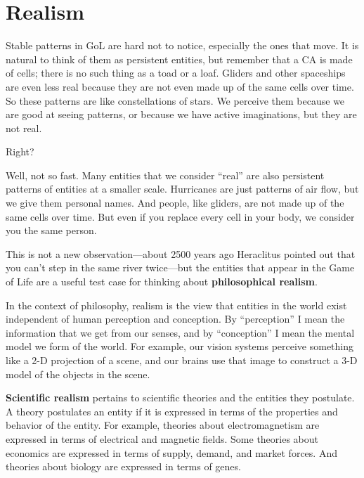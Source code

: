 \documentclass[12pt]{book}
\theoremstyle{exercise}
\begin{document}


\section{Realism}

Stable patterns in GoL are hard not to notice, especially the ones
that move.  It is natural to think of them as persistent entities, but
remember that a CA is made of cells; there is no such thing as a toad
or a loaf.  Gliders and other spaceships are even less real because
they are not even made up of the same cells over time.  So these
patterns are like constellations of stars.  We perceive them because
we are good at seeing patterns, or because we have active
imaginations, but they are not real.


Right?

Well, not so fast.  Many entities that we consider ``real'' are also
persistent patterns of entities at a smaller scale.  Hurricanes are
just patterns of air flow, but we give them personal names.  And
people, like gliders, are not made up of the same cells over time.
But even if you replace every cell in your body, we consider you the
same person.


This is not a new observation---about 2500 years ago Heraclitus
pointed out that you can't step in the same river twice---but the
entities that appear in the Game of Life are a useful test case for
thinking about {\bf philosophical realism}.


In the context of philosophy, realism is the view that entities
in the world exist independent of human perception and conception.
By ``perception'' I mean the information that we get from
our senses, and by ``conception'' I mean the mental model
we form of the world.  For example, our vision systems perceive
something like a 2-D projection of a scene, and our brains
use that image to construct a 3-D model of the objects in the
scene.


{\bf Scientific realism} pertains to scientific theories and the
entities they postulate.
A theory postulates an entity if it is
expressed in terms of the properties and behavior of the entity.
For example, theories about electromagnetism are expressed in
terms of electrical and magnetic fields.  Some theories about economics
are expressed in terms of supply, demand, and market forces.
And theories about biology are expressed in terms of genes.
\end{document}

